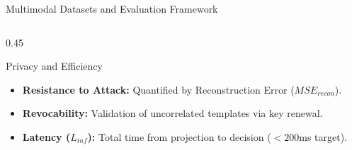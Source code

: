 \begin{frame}{Multimodal Datasets and Evaluation Framework}
\begin{columns}[T]
\begin{column}{0.45\textwidth}
            \begin{block}{Privacy and Efficiency}
                \fontsize{7pt}{8pt}\selectfont
                \begin{itemize}
                    \item \textbf{Resistance to Attack:} Quantified by Reconstruction Error ($MSE_{recon}$).
                    \item \textbf{Revocability:} Validation of uncorrelated templates via key renewal.
                    \item \textbf{Latency ($L_{inf}$):} Total time from projection to decision ($<200$ms target).
                \end{itemize}
            \end{block}
        \end{column}
    \end{columns}
\end{frame}